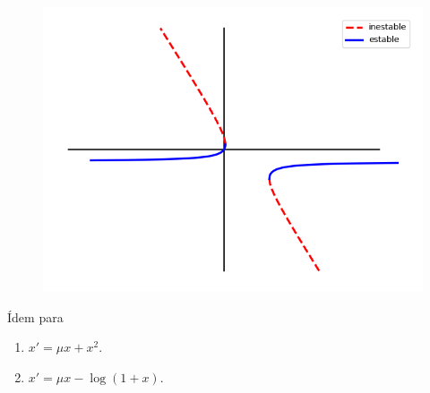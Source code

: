 \documentclass[11pt]{report}
\begin{document}
\begin{solution}
\begin{figure}[H]
        \includegraphics[scale=0.5]{img/6.png}
    \end{figure}
\end{solution}

\begin{exercise}
    Ídem para
    \begin{enumerate}
        \item $x' = \mu x + x^2$.
        \item $x' = \mu x -\log(1+x)$.
    \end{enumerate}
\end{exercise}
\end{document}
